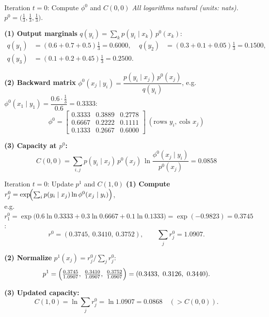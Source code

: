 \documentclass{beamer}
\begin{document}
\begin{frame}{Iteration $t=0$: Compute $\phi^0$ and $C(0,0)$}
    \footnotesize
    \textit{All logarithms natural (units: nats).}\quad $p^0=\bigl(\tfrac13,\tfrac13,\tfrac13\bigr)$.
    \medskip

    \textbf{(1) Output marginals } $q(y_i)=\sum_k p(y_i\mid x_k)\,p^0(x_k)$:
    \begin{align*}
        q(y_1)&=(0.6+0.7+0.5)\tfrac13=0.6000, &
        q(y_2)&=(0.3+0.1+0.05)\tfrac13=0.1500,\\
        q(y_3)&=(0.1+0.2+0.45)\tfrac13=0.2500. &&
    \end{align*}

    \textbf{(2) Backward matrix } $\phi^0(x_j\mid y_i)=\dfrac{p(y_i\mid x_j)\,p^0(x_j)}{q(y_i)}$,\;
    e.g.\ $\phi^0(x_1\mid y_1)=\dfrac{0.6\cdot\frac13}{0.6}=0.3333$:
    $$
    \phi^0=
    \begin{bmatrix}
        0.3333 & 0.3889 & 0.2778 \\
        0.6667 & 0.2222 & 0.1111 \\
        0.1333 & 0.2667 & 0.6000
    \end{bmatrix}\ (\text{rows }y_i,\ \text{cols }x_j)
    $$

    \textbf{(3) Capacity at $p^0$:}
    $$
    C(0,0)=\sum_{i,j} p(y_i\mid x_j)\,p^0(x_j)\,\ln\frac{\phi^0(x_j\mid y_i)}{p^0(x_j)}=0.0858
    $$
\end{frame}

\begin{frame}{Iteration $t=0$: Update $p^1$ and $C(1,0)$}
    \footnotesize
    \textbf{(1) Compute } $r_j^0=\exp\!\Bigl(\sum_i p(y_i\mid x_j)\ln\phi^0(x_j\mid y_i)\Bigr)$,\\
    e.g.\ $r_1^0=\exp\bigl(0.6\ln0.3333+0.3\ln0.6667+0.1\ln0.1333\bigr)=\exp(-0.9823)=0.3745$:
    $$
    r^0=(0.3745,\ 0.3410,\ 0.3752),\qquad \textstyle\sum_j r_j^0=1.0907.
    $$

    \textbf{(2) Normalize } $p^1(x_j)=r_j^0\big/\sum_j r_j^0$:
    $$
    p^1=\Bigl(\tfrac{0.3745}{1.0907},\ \tfrac{0.3410}{1.0907},\ \tfrac{0.3752}{1.0907}\Bigr)=(0.3433,\ 0.3126,\ 0.3440).
    $$

    \textbf{(3) Updated capacity:}
    $$
    C(1,0)=\ln\textstyle\sum_j r_j^0=\ln 1.0907=0.0868\quad(>C(0,0)).
    $$
\end{frame}
\end{document}
